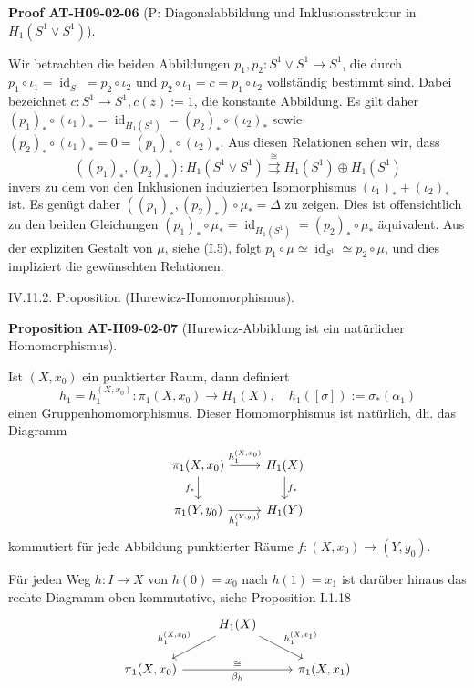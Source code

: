 \documentclass[10pt, letterpaper]{article}
\newcommand{\CustomHeading}[3]{%
  \par\medskip\noindent%
  \textbf{#1 #2} \textnormal{(#3)}.\enskip%
}
\newenvironment{PROP}[2]{\begin{unitbox}\CustomHeading{Proposition}{#1}{#2}}{\end{unitbox}}
\newenvironment{PROOF}[2]{\begin{unitbox}\CustomHeading{Proof}{#1}{#2}}{\end{unitbox}}
\begin{document}
\begin{PROOF}{AT-H09-02-06}{P: Diagonalabbildung und Inklusionsstruktur in $H_1\left(S^1 \vee S^1\right)$}
Wir betrachten die beiden Abbildungen $p_1, p_2: S^1 \vee S^1 \rightarrow S^1$, die durch $p_1 \circ \iota_1=\operatorname{id}_{S^1}=p_2 \circ \iota_2$ und $p_2 \circ \iota_1=c=p_1 \circ \iota_2$ vollständig bestimmt sind. Dabei bezeichnet $c: S^1 \rightarrow S^1, c(z):=1$, die konstante Abbildung. Es gilt daher $\left(p_1\right)_* \circ\left(\iota_1\right)_*=\operatorname{id}_{H_1\left(S^1\right)}=\left(p_2\right)_* \circ\left(\iota_2\right)_*$ sowie $\left(p_2\right)_* \circ\left(\iota_1\right)_*=0=\left(p_1\right)_* \circ\left(\iota_2\right)_*$. Aus diesen Relationen sehen wir, dass
$$
\left(\left(p_1\right)_*,\left(p_2\right)_*\right): H_1\left(S^1 \vee S^1\right) \stackrel{\cong}{\rightrightarrows} H_1\left(S^1\right) \oplus H_1\left(S^1\right)
$$
invers zu dem von den Inklusionen induzierten Isomorphismus $\left(\iota_1\right)_*+\left(\iota_2\right)_*$ ist. Es genügt daher $\left(\left(p_1\right)_*,\left(p_2\right)_*\right) \circ \mu_*=\Delta$ zu zeigen. Dies ist offensichtlich zu den beiden Gleichungen $\left(p_1\right)_* \circ \mu_*=\operatorname{id}_{H_1\left(S^1\right)}=\left(p_2\right)_* \circ \mu_*$ äquivalent. Aus der expliziten Gestalt von $\mu$, siehe (I.5), folgt $p_1 \circ \mu \simeq \operatorname{id}_{S^1} \simeq p_2 \circ \mu$, und dies impliziert die gewünschten Relationen.
\end{PROOF}




IV.11.2. Proposition (Hurewicz-Homomorphismus). 


\begin{PROP}{AT-H09-02-07}{Hurewicz-Abbildung ist ein natürlicher Homomorphismus}
Ist $(X, x_0)$ ein punktierter Raum, dann definiert 
$$h_1=h_1^{\left(X, x_0\right)}: \pi_1\left(X, x_0\right) \rightarrow H_1(X), \quad h_1([\sigma]):=\sigma_*\left(\alpha_1\right)$$
einen Gruppenhomomorphismus. Dieser Homomorphismus ist natürlich, dh. das Diagramm
\[
\begin{tikzcd}
\pi_1(X, x_0) \arrow[r, "h_1^{(X,x_0)}"] \arrow[d, "f_*"'] & H_1(X) \arrow[d, "f_*"] \\
\pi_1(Y, y_0) \arrow[r, "h_1^{(Y,y_0)}"'] & H_1(Y)
\end{tikzcd}
\]
kommutiert für jede Abbildung punktierter Räume $f:\left(X, x_0\right) \rightarrow\left(Y, y_0\right)$. 

Für jeden Weg $h: I \rightarrow X$ von $h(0)=x_0$ nach $h(1)=x_1$ ist darüber hinaus das rechte Diagramm oben kommutative, siehe Proposition I.1.18
\[
\begin{tikzcd}
  & H_1(X) \arrow[dl, "h_1^{(X,x_0)}"'] \arrow[dr, "h_1^{(X,x_1)}"] \\
  \pi_1(X, x_0) \arrow[rr, "\beta_h"', "\cong"{above}] & & \pi_1(X, x_1)
\end{tikzcd}
\]
\end{PROP}
\end{document}
